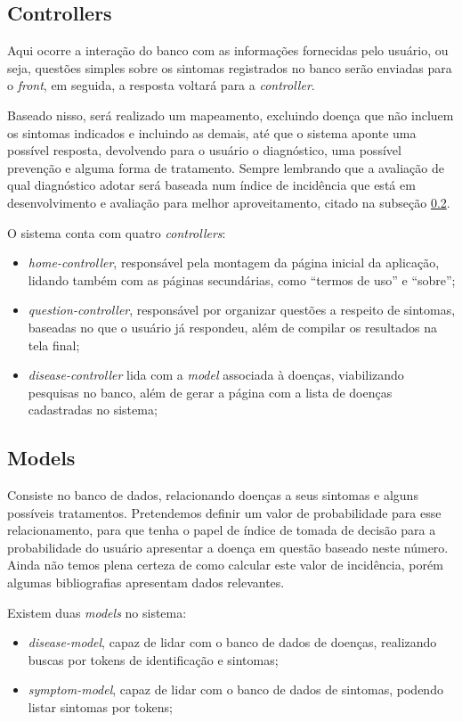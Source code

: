 \subsection{Controllers}

Aqui ocorre a interação do banco com as informações fornecidas pelo usuário, ou seja, questões simples sobre os sintomas registrados no banco serão enviadas para o \emph{front}, em seguida, a resposta voltará para a \emph{controller}.

Baseado nisso, será realizado um mapeamento, excluindo doença que não incluem os sintomas indicados e incluindo as demais, até que o sistema aponte uma possível resposta, devolvendo para o usuário o diagnóstico, uma possível prevenção e alguma forma de tratamento.
Sempre lembrando que a avaliação de qual diagnóstico adotar será baseada num índice de incidência que está em desenvolvimento e avaliação para melhor aproveitamento, citado na subseção \ref{ssec:models}.

O sistema conta com quatro \emph{controllers}:

\begin{itemize}
	\item \emph{home-controller}, responsável pela montagem da página inicial da aplicação, lidando também com as páginas secundárias, como ``termos de uso'' e ``sobre'';
	\item \emph{question-controller}, responsável por organizar questões a respeito de sintomas, baseadas no que o usuário já respondeu, além de compilar os resultados na tela final;
	\item \emph{disease-controller} lida com a \emph{model} associada à doenças, viabilizando pesquisas no banco, além de gerar a página com a lista de doenças cadastradas no sistema;
\end{itemize}

\subsection{Models}\label{ssec:models}

Consiste no banco de dados, relacionando doenças a seus sintomas e alguns possíveis tratamentos.
Pretendemos definir um valor de probabilidade para esse relacionamento, para que tenha o papel de índice de tomada de decisão para a probabilidade do usuário apresentar a doença em questão baseado neste número.
Ainda não temos plena certeza de como calcular este valor de incidência, porém algumas bibliografias apresentam dados relevantes\cite{AlbertEinstein, longo2011harrison}.

Existem duas \emph{models} no sistema:

\begin{itemize}
	\item \emph{disease-model}, capaz de lidar com o banco de dados de doenças, realizando buscas por tokens de identificação e sintomas;
	\item \emph{symptom-model}, capaz de lidar com o banco de dados de sintomas, podendo listar sintomas por tokens;
\end{itemize}
